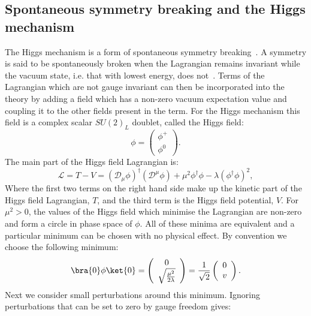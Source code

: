 \subsection{Spontaneous symmetry breaking and the Higgs mechanism}
\label{sec:ssb}
The Higgs mechanism is a form of spontaneous symmetry breaking~\cite{Englert:1964et,Higgs:1964ia,Higgs:1964pj,Guralnik:1964eu,Higgs:1966ev,Kibble:1967sv}. A symmetry is said to be spontaneously broken when the Lagrangian remains invariant while the vacuum state, i.e. that with lowest energy, does not~\cite{griffiths2008introduction}. Terms of the Lagrangian which are not gauge invariant can then be incorporated into the theory by adding a field which has a non-zero vacuum expectation value and coupling it to the other fields present in the term. For the Higgs mechanism this field is a complex scalar $SU\left(2\right)_{L}$ doublet, called the Higgs field:
\begin{equation}
\phi=\left(\begin{array}{c}\phi^+ \\ \phi^0 \end{array}\right).
\end{equation}
The main part of the Higgs field Lagrangian is:
\begin{equation}
  \label{eq:higlag}
\mathcal{L}=T-V=\left(\mathcal{D}_{\mu}\phi\right)^{\dag}\left(\mathcal{D}^{\mu}\phi\right)+\mu^{2}\phi^{\dag}\phi-\lambda\left(\phi^{\dag}\phi\right)^{2},
\end{equation}
Where the first two terms on the right hand side make up the kinetic part of the Higgs field Lagrangian, $T$, and the third term is the Higgs field potential, $V$. For $\mu^{2}>0$, the values of the Higgs field which minimise the Lagrangian are  non-zero and form a circle in phase space of $\phi$. All of these minima are equivalent and a particular minimum can be chosen with no physical effect. By convention we choose the following minimum:
\begin{equation}
  \bra{0}\phi\ket{0}=\left(\begin{array}{c} 0 \\ \sqrt{\frac{\mu^{2}}{2\lambda}} \end{array}\right)=\frac{1}{\sqrt{2}}\left(\begin{array}{c} 0 \\ v \end{array}\right).
\end{equation}
Next we consider small perturbations around this minimum. Ignoring perturbations that can be set to zero by gauge freedom gives:
